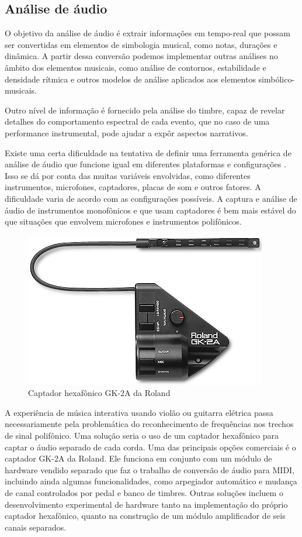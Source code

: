 \documentclass[draft]{ppgmus}
\begin{document}
\subsection{Análise de áudio}
\label{sec-audioanalise}


O objetivo da análise de áudio é extrair informações em tempo-real
que possam ser convertidas em elementos de simbologia musical, como notas, durações e dinâmica.
A partir dessa conversão podemos implementar outras análises no 
âmbito dos elementos musicais, como análise de contornos, estabilidade e 
densidade rítmica e outros modelos de análise aplicados aos elementos
simbólico-musicais. 

Outro nível de informação é fornecido pela análise do timbre, capaz
de revelar detalhes do comportamento espectral de cada evento, que no caso de uma 
performance instrumental, pode ajudar a expôr aspectos narrativos.

Existe uma certa dificuldade na tentativa de definir uma ferramenta genérica de análise de áudio 
que funcione igual em diferentes plataformas e configurações .
Isso se dá por conta das muitas variáveis envolvidas, como diferentes instrumentos, microfones, 
captadores, placas de som e outros fatores.
A dificuldade varia de acordo com as configurações possíveis. A captura e análise de áudio
 de instrumentos monofônicos e que usam captadores é bem mais estável
do que situações que envolvem microfones e instrumentos polifônicos.

\begin{figure}
\includegraphics[scale=.5]{gk-2a}
\caption{Captador hexafônico GK-2A da Roland}
\label{gk-2a}
\end{figure} 


A experiência de música interativa usando violão ou guitarra elétrica passa necessariamente
pela problemática do reconhecimento de frequências nos trechos de sinal polifônico.
Uma solução seria o uso de um captador hexafônico para captar o áudio separado de
cada corda. Uma das principais opções comerciais é o captador GK-2A da Roland.
Ele funciona em conjunto com um módulo de hardware vendido separado que faz o trabalho de conversão 
de áudio para MIDI, incluindo ainda algumas funcionalidades, como arpegiador automático
e mudança de canal controlados por pedal  e banco de timbres.
Outras soluções incluem o desenvolvimento experimental de hardware tanto na implementação
do próprio captador hexafônico, quanto na construção de um módulo amplificador de seis
canais separados.
\end{document}
